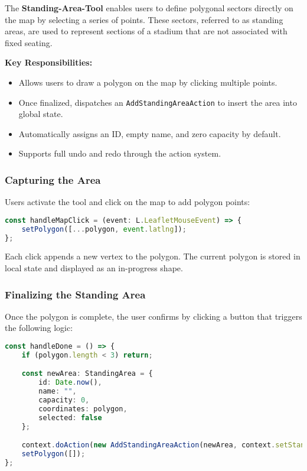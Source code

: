 The \textbf{Standing-Area-Tool} enables users to define polygonal sectors directly on the map by selecting a series of points. These sectors, referred to as standing areas, are used to represent sections of a stadium that are not associated with fixed seating.

\textbf{Key Responsibilities:}
\begin{itemize}
    \item Allows users to draw a polygon on the map by clicking multiple points.
    \item Once finalized, dispatches an \texttt{AddStandingAreaAction} to insert the area into global state.
    \item Automatically assigns an ID, empty name, and zero capacity by default.
    \item Supports full undo and redo through the action system.
\end{itemize}

\subsubsection{Capturing the Area}
Users activate the tool and click on the map to add polygon points:

\begin{lstlisting}[language=TypeScript, caption=Adding Polygon Points, label=lst:standingarea-add-point]
const handleMapClick = (event: L.LeafletMouseEvent) => {
    setPolygon([...polygon, event.latlng]);
};
\end{lstlisting}

Each click appends a new vertex to the polygon. The current polygon is stored in local state and displayed as an in-progress shape.

\subsubsection{Finalizing the Standing Area}
Once the polygon is complete, the user confirms by clicking a button that triggers the following logic:

\begin{lstlisting}[language=TypeScript, caption=Finalizing Standing Area, label=lst:standingarea-finalize]
const handleDone = () => {
    if (polygon.length < 3) return;

    const newArea: StandingArea = {
        id: Date.now(),
        name: "",
        capacity: 0,
        coordinates: polygon,
        selected: false
    };

    context.doAction(new AddStandingAreaAction(newArea, context.setStandingAreas));
    setPolygon([]);
};
\end{lstlisting}

